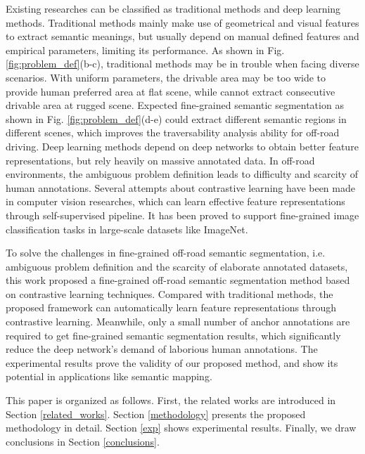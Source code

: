 \documentclass[letterpaper, 10 pt, conference]{ieeeconf}  %
\begin{document}
Existing researches can be classified as traditional methods and deep learning methods.
Traditional methods mainly make use of geometrical and visual features to extract semantic meanings, but usually depend on manual defined features and empirical parameters, limiting its performance. As shown in Fig. \ref{fig:problem_def}(b-c), traditional methods may be in trouble when facing diverse scenarios. With uniform parameters, the drivable area may be too wide to provide human preferred area at flat scene, while cannot extract consecutive drivable area at rugged scene. Expected fine-grained semantic segmentation as shown in Fig. \ref{fig:problem_def}(d-e) could extract different semantic regions in different scenes, which improves the traversability analysis ability for off-road driving.
Deep learning methods depend on deep networks to obtain better feature representations, but rely heavily on massive annotated data. In off-road environments, the ambiguous problem definition leads to difficulty and scarcity of human annotations.
Several attempts about contrastive learning have been made in computer vision researches, which can learn effective feature representations through self-supervised pipeline. It has been proved to support fine-grained image classification tasks in large-scale datasets like ImageNet\cite{deng2009imagenet}.

To solve the challenges in fine-grained off-road semantic segmentation, i.e. ambiguous problem definition and the scarcity of elaborate annotated datasets, this work proposed a fine-grained off-road semantic segmentation method based on contrastive learning techniques. Compared with traditional methods, the proposed framework can automatically learn feature representations through contrastive learning. Meanwhile, only a small number of anchor annotations are required to get fine-grained semantic segmentation results, which significantly reduce the deep network's demand of laborious human annotations. The experimental results prove the validity of our proposed method, and show its potential in applications like semantic mapping.

This paper is organized as follows. First, the related works
are introduced in Section \ref{related_works}. Section \ref{methodology} presents the proposed methodology in detail. Section \ref{exp} shows experimental results. Finally, we draw conclusions in Section \ref{conclusions}.
\end{document}
